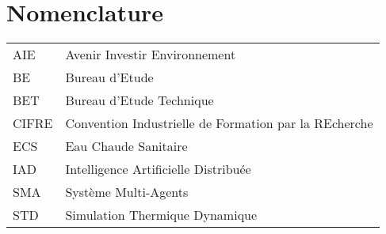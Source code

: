 \chapter*{Nomenclature}

\begin{tabular}{l|l}
AIE & Avenir Investir Environnement \\
BE & Bureau d'Etude \\
BET & Bureau d'Etude Technique \\
CIFRE & Convention Industrielle de Formation par la REcherche \\
ECS & Eau Chaude Sanitaire \\
IAD & Intelligence Artificielle Distribuée\\
SMA & Système Multi-Agents\\
STD & Simulation Thermique Dynamique \\
\end{tabular}
